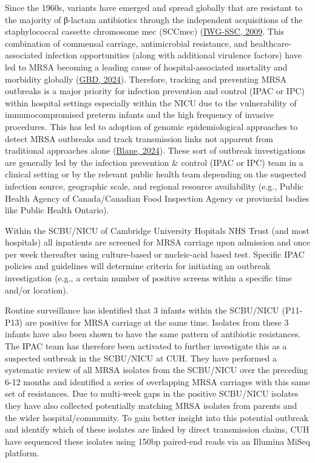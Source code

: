 \documentclass[
]{book}
\begin{document}
Since the 1960s, variants have emerged and spread globally that are resistant to the majority of β-lactam antibiotics through the independent acquisitions of the staphylococcal cassette chromosome mec (SCCmec) (\href{https://doi.org/10.1128/AAC.00579-09}{IWG-SSC, 2009}. This combination of commensal carriage, antimicrobial resistance, and healthcare-associated infection opportunities (along with additional virulence factors) have led to MRSA becoming a leading cause of hospital-associated mortality and morbidity globally (\href{https://doi.org/10.1016/s0140-6736(24)01867-1}{GBD, 2024}). Therefore, tracking and preventing MRSA outbreaks is a major priority for infection prevention and control (IPAC or IPC) within hospital settings especially within the NICU due to the vulnerability of immunocompromised preterm infants and the high frequency of invasive procedures.
This has led to adoption of genomic epidemiological approaches to detect MRSA outbreaks and track transmission links not apparent from traditional approaches alone (\href{https://doi.org/10.1099/mgen.0.001235}{Blane, 2024}). These sort of outbreak investigations are generally led by the infection prevention \& control (IPAC or IPC) team in a clinical setting or by the relevant public health team depending on the suspected infection source, geographic scale, and regional resource availability (e.g., Public Health Agency of Canada/Canadian Food Inspection Agency or provincial bodies like Public Health Ontario).

Within the SCBU/NICU of Cambridge University Hopitals NHS Trust (and most hospitals) all inpatients are screened for MRSA carriage upon admission and once per week thereafter using culture-based or nucleic-acid based test. Specific IPAC policies and guidelines will determine criteria for initiating an outbreak investigation (e.g., a certain number of positive screens within a specific time and/or location).

Routine surveillance has identified that 3 infants within the SCBU/NICU (P11-P13) are positive for MRSA carriage at the same time. Isolates from these 3 infants have also been shown to have the same pattern of antibiotic resistances. The IPAC team has therefore been activated to further investigate this as a suspected outbreak in the SCBU/NICU at CUH.
They have performed a systematic review of all MRSA isolates from the SCBU/NICU over the preceding 6-12 months and identified a series of overlapping MRSA carriages with this same set of resistances. Due to multi-week gaps in the positive SCBU/NICU isolates they have also collected potentially matching MRSA isolates from parents and the wider hospital/community. To gain better insight into this potential outbreak and identify which of these isolates are linked by direct transmission chains, CUH have sequenced these isolates using 150bp paired-end reads via an Illumina MiSeq platform.
\end{document}
